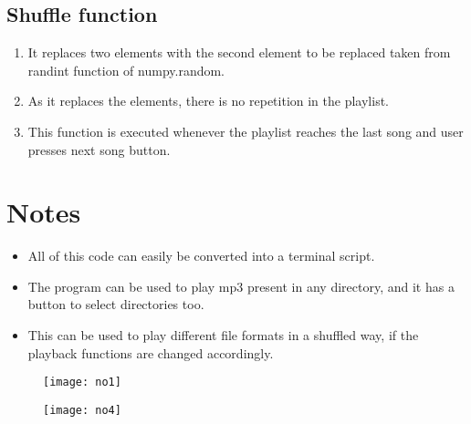 \documentclass{article}
\begin{document}
\subsection*{Shuffle function}
\begin{enumerate}
    \item It replaces two elements with the second element to be replaced taken from randint function of numpy.random.
    \item As it replaces the elements, there is no repetition in the playlist.
    \item This function is executed whenever the playlist reaches the last song and user presses next song button.
\end{enumerate}

\section{Notes}
\begin{itemize}
    \item All of this code can easily be converted into a terminal script.
    \item The program can be used to play mp3 present in any directory, and it has a button to select directories too.
    \item This can be used to play different file formats in a shuffled way, if the playback functions are changed accordingly.
\end{itemize}

\begin{figure}[ht]
	\centering
	\texttt{[image: no1]}
	\label{fig:view}
\end{figure}
\FloatBarrier


\begin{figure}[ht]
	\centering
	\texttt{[image: no4]}
	\label{fig:view}
\end{figure}
\FloatBarrier
\end{document}
